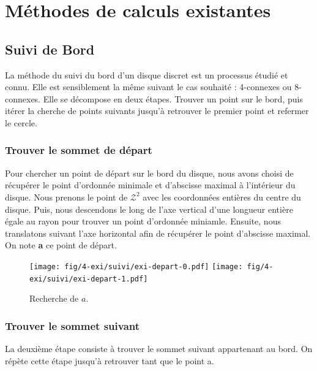 \section{Méthodes de calculs existantes}

\subsection{Suivi de Bord}

La méthode du suivi du bord d'un disque discret est un processus étudié et connu. Elle est sensiblement la même suivant le cas souhaité : 4-connexes ou 8-connexes. Elle se décompose en deux étapes. Trouver un point sur le bord, puis itérer la cherche de points suivants jusqu'à retrouver le premier point et refermer le cercle.

\subsubsection{Trouver le sommet de départ}

Pour chercher un point de départ sur le bord du disque, nous avons choisi de récupérer le point d'ordonnée minimale et d'abscisse maximal à l'intérieur du disque. Nous prenons le point de $\mathcal{Z}^2$ avec les coordonnées entières du centre du disque. Puis, nous descendons le long de l'axe vertical d'une longueur entière égale au rayon pour trouver un point d'ordonnée miniamle. Ensuite, nous translatons suivant l'axe horizontal afin de récupérer le point d'abscisse maximal. On note \textbf{a} ce point de départ. 

\begin{figure}[H]
  \centering
  \texttt{[image: fig/4-exi/suivi/exi-depart-0.pdf]}
  \texttt{[image: fig/4-exi/suivi/exi-depart-1.pdf]}
  \caption{Recherche de $a$.}
\end{figure}
  

\subsubsection{Trouver le sommet suivant}

La deuxième étape consiste à trouver le sommet suivant appartenant au bord. On répète cette étape jusqu'à retrouver tant que le point a.

